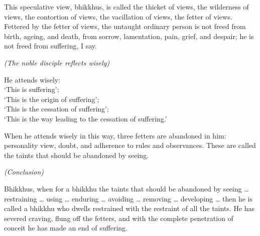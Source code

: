 {This speculative view, bhikkhus, is called the thicket of views, the
wilderness of views, the contortion of views, the vacillation of views,
the fetter of views. Fettered by the fetter of views, the untaught
ordinary person is not freed from birth, ageing, and death, from sorrow,
lamentation, pain, grief, and despair; he is not freed from suffering, I
say.

\emph{(The noble disciple reflects wisely)}

He attends wisely:\\
`This is suffering';\\
`This is the origin of suffering';\\
`This is the cessation of suffering';\\
`This is the way leading to the cessation of suffering.'

When he attends wisely in this way, three fetters are abandoned in him:
personality view, doubt, and adherence to rules and observances. These
are called the taints that should be abandoned by seeing.

\enlargethispage*{\baselineskip}

\emph{(Conclusion)}

Bhikkhus, when for a bhikkhu the taints that should be abandoned by seeing
\ldots{} restraining \ldots{} using \ldots{} enduring \ldots{} avoiding \ldots{}
removing \ldots{} developing \ldots{} then he is called a bhikkhu who dwells
restrained with the restraint of all the taints. He has severed craving, flung
off the fetters, and with the complete penetration of conceit he has made an end
of suffering.

}
